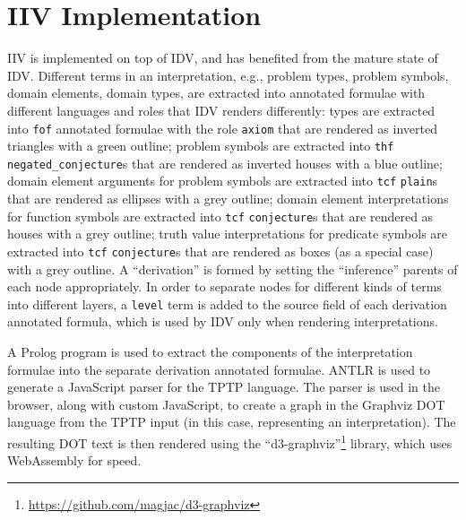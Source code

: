 \documentclass[letterpaper]{article}
\newcommand{\smalltt}[1]{\small \texttt{#1}}
\begin{document}
{%
\section{IIV Implementation}
\label{Implementation}

IIV is implemented on top of IDV, and has benefited from the mature state of IDV.
Different terms in an interpretation, e.g., problem types, problem symbols, domain elements,
domain types, are extracted into annotated formulae with different languages and roles that
IDV renders differently: 
types are extracted into {\smalltt{fof}} annotated formulae with the role {\smalltt{axiom}}
that are rendered as inverted triangles with a green outline;
problem symbols are extracted into {\smalltt{thf}} {\smalltt{negated\_conjecture}}s
that are rendered as inverted houses with a blue outline;
domain element arguments for problem symbols are extracted into {\smalltt{tcf}} {\smalltt{plain}}s
that are rendered as ellipses with a grey outline;
domain element interpretations for function symbols are extracted into {\smalltt{tcf}}
{\smalltt{conjecture}}s that are rendered as houses with a grey outline;
truth value interpretations for predicate symbols are extracted into {\smalltt{tcf}}
{\smalltt{conjecture}}s that are rendered as boxes (as a special case) with a grey outline.
A ``derivation'' is formed by setting the ``inference'' parents of each node appropriately.
In order to separate nodes for different kinds of terms into different layers, a {\smalltt{level}}
term is added to the source field of each derivation annotated formula, which is used by IDV only
when rendering interpretations.

A Prolog program is used to extract the components of the interpretation formulae into 
the separate derivation annotated formulae.
ANTLR is used to generate a JavaScript parser for the TPTP language.
The parser is used in the browser, along with custom JavaScript, to create a graph in 
the Graphviz DOT language \cite{EG+02} from the TPTP input (in this case, representing an 
interpretation).
The resulting DOT text is then rendered using the ``d3-graphviz''\footnote{%
\url{https://github.com/magjac/d3-graphviz}} library, which uses WebAssembly for speed.

}
\end{document}
